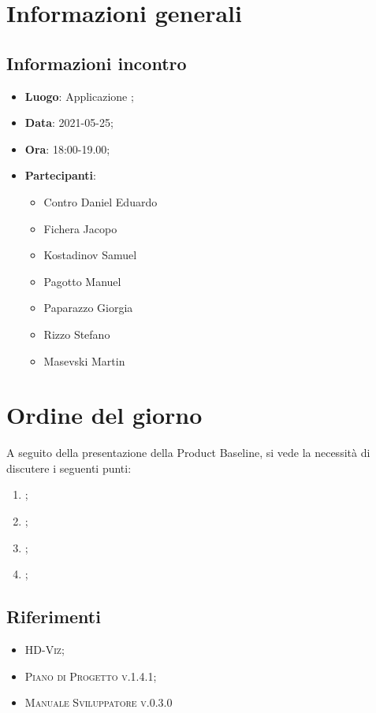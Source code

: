 \documentclass{article}
\begin{document}


\section{Informazioni generali}
\label{sec:info_generali}

\subsection{Informazioni incontro}
\label{sub:info_incontro}

\begin{itemize}
	\item \textbf{Luogo}: Applicazione ;
	\item \textbf{Data}: 2021-05-25;
	\item \textbf{Ora}: 18:00-19.00;
	\item \textbf{Partecipanti}:
	\begin{itemize}
		\item Contro Daniel Eduardo
		\item Fichera Jacopo
		\item Kostadinov Samuel
        \item Pagotto Manuel
		\item Paparazzo Giorgia
		\item Rizzo Stefano
		\item Masevski Martin
	\end{itemize}
\end{itemize}

\section{Ordine del giorno}%
\label{sec:ordine_del_giorno}
A seguito della presentazione della Product Baseline, si vede la necessità di discutere i seguenti punti:
\begin{enumerate}
	\item {};
	\item {};
	\item {};
	\item {};
\end{enumerate}


\subsection{Riferimenti}%
\label{sub:riferimenti}
\begin{itemize}
    \item \textsc{HD-Viz};
    \item \textsc{Piano di Progetto v.1.4.1};
    \item \textsc{Manuale Sviluppatore v.0.3.0}
    \end{itemize}
\end{document}
